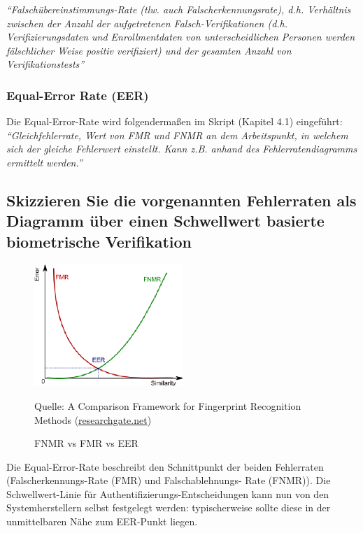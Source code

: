 \documentclass{article}
\newcommand{\figuresource}[1]{
	\begin{center}Quelle: {#1}\end{center}
}
\begin{document}
\textit{
``Falschübereinstimmungs-Rate (tlw. auch Falscherkennungsrate), d.h. Verhältnis zwischen der Anzahl der aufgetretenen Falsch-Verifikationen (d.h. Verifizierungsdaten und Enrollmentdaten von unterscheidlichen Personen werden fälschlicher Weise positiv verifiziert) und der gesamten Anzahl von Verifikationstests''
}

\subsubsection{Equal-Error Rate (EER)}

Die Equal-Error-Rate wird folgendermaßen im Skript (Kapitel 4.1) eingeführt:\\[0.1em]

\textit{
``Gleichfehlerrate, Wert von FMR und FNMR an dem Arbeitspunkt, in welchem sich der gleiche Fehlerwert einstellt. Kann z.B. anhand des Fehlerratendiagramms ermittelt werden.''
}

\newpage

\subsection{Skizzieren Sie die vorgenannten Fehlerraten als Diagramm \"uber einen Schwellwert basierte biometrische Verifikation}

\begin{figure}[ht]
	\includegraphics[width=0.5\textwidth]{assets/fnmr-fmr-eer}
	\centering
	\caption{FNMR vs FMR vs EER}
	\figuresource{A Comparison Framework for Fingerprint Recognition Methods
		(\href{https://www.researchgate.net/figure/The-Relationship-between-FNMR-FMR-and-ERR_fig3_259558386}{researchgate.net})
	}
\end{figure}

Die Equal-Error-Rate beschreibt den Schnittpunkt der beiden Fehlerraten (Falscherkennungs-Rate (FMR) und Falschablehnungs-
Rate (FNMR)). Die Schwellwert-Linie für Authentifizierungs-Entscheidungen kann nun von den Systemherstellern selbst
festgelegt werden: typischerweise sollte diese in der unmittelbaren Nähe zum EER-Punkt liegen.
\end{document}
